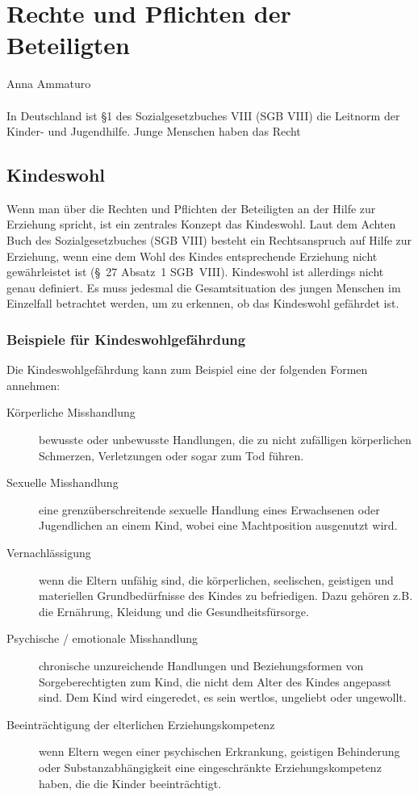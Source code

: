 \documentclass{ejsreport}
\begin{document}
\setcounter{chapter}{1}
\chapter{Rechte und Pflichten der Beteiligten}
Anna Ammaturo
\\
\\
In Deutschland ist §1 des Sozialgesetzbuches VIII (SGB VIII) 
die Leitnorm der Kinder- und Jugendhilfe. \autocite[Vgl.][S.78]{Albrecht2019}
Junge Menschen haben das Recht 

\section{Kindeswohl}

Wenn man über die Rechten und Pflichten der Beteiligten 
an der Hilfe zur Erziehung spricht,
ist ein zentrales Konzept das Kindeswohl.  
Laut dem Achten Buch des Sozialgesetzbuches (SGB VIII) besteht ein Rechtsanspruch 
auf Hilfe zur Erziehung, wenn eine dem Wohl des Kindes 
entsprechende Erziehung nicht gewährleistet ist 
(§~27 Absatz~1 SGB~VIII). Kindeswohl ist allerdings nicht
genau definiert. Es muss jedesmal die Gesamtsituation des jungen
Menschen im Einzelfall betrachtet werden, um zu erkennen, 
ob das Kindeswohl gefährdet ist.

\subsection{Beispiele für Kindeswohlgefährdung}
Die Kindeswohlgefährdung kann zum Beispiel 
eine der folgenden Formen annehmen: \autocite[Vgl.][S.~38~ff.]{Maihorn2009}

\begin{description}
  \item [Körperliche Misshandlung] 
  bewusste oder unbewusste Handlungen, die zu nicht zu\-fälligen
  körperlichen Schmerzen, Verletzungen oder sogar zum Tod führen.
  \item [Sexuelle Misshandlung]
  eine grenzüberschreitende sexuelle Handlung eines Erwachsenen
  oder Jugendlichen an einem Kind, wobei eine Machtposition
  ausgenutzt wird.
  \item [Vernachlässigung]
  wenn die Eltern unfähig sind, die körperlichen, seelischen, geistigen
  und materiellen Grundbedürfnisse des Kindes zu befriedigen. 
  Dazu gehören z.B. die Ernährung, Kleidung und die Gesundheitsfürsorge.
  \item [Psychische / emotionale Misshandlung]
  chronische unzureichende Handlungen und Beziehungsformen
  von Sorgeberechtigten zum Kind, die nicht dem Alter des Kindes
  angepasst sind. Dem Kind wird eingeredet, es sein wertlos, ungeliebt
  oder ungewollt.
  \item [Beeinträchtigung der elterlichen Erziehungskompetenz]
  wenn Eltern wegen einer psychischen Erkrankung, 
  geistigen Behinderung oder Substanzabhängigkeit eine eingeschränkte
  Erziehungskompetenz haben, die die Kinder beeinträchtigt.
\end{description}
\end{document}
